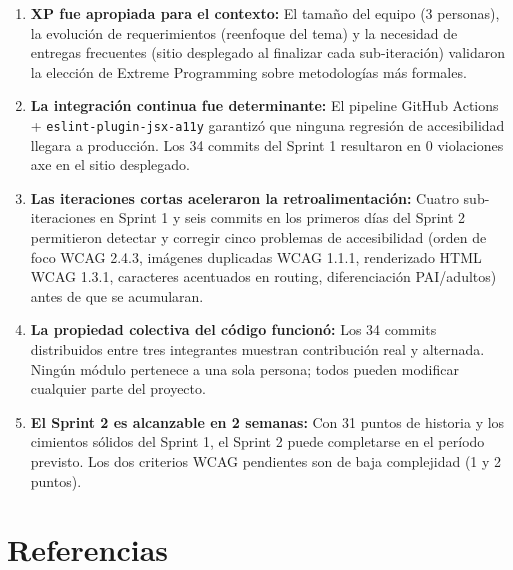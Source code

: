 \documentclass[12pt, a4paper]{article}
\begin{document}
\begin{enumerate}
  \item \textbf{XP fue apropiada para el contexto:} El tamaño del equipo (3 personas), la evolución de requerimientos (reenfoque del tema) y la necesidad de entregas frecuentes (sitio desplegado al finalizar cada sub-iteración) validaron la elección de Extreme Programming sobre metodologías más formales.

  \item \textbf{La integración continua fue determinante:} El pipeline GitHub Actions + \texttt{eslint-plugin-jsx-a11y} garantizó que ninguna regresión de accesibilidad llegara a producción. Los 34 commits del Sprint 1 resultaron en 0 violaciones axe en el sitio desplegado.

  \item \textbf{Las iteraciones cortas aceleraron la retroalimentación:} Cuatro sub-iteraciones en Sprint 1 y seis commits en los primeros días del Sprint 2 permitieron detectar y corregir cinco problemas de accesibilidad (orden de foco WCAG 2.4.3, imágenes duplicadas WCAG 1.1.1, renderizado HTML WCAG 1.3.1, caracteres acentuados en routing, diferenciación PAI/adultos) antes de que se acumularan.

  \item \textbf{La propiedad colectiva del código funcionó:} Los 34 commits distribuidos entre tres integrantes muestran contribución real y alternada. Ningún módulo pertenece a una sola persona; todos pueden modificar cualquier parte del proyecto.

  \item \textbf{El Sprint 2 es alcanzable en 2 semanas:} Con 31 puntos de historia y los cimientos sólidos del Sprint 1, el Sprint 2 puede completarse en el período previsto. Los dos criterios WCAG pendientes son de baja complejidad (1 y 2 puntos).
\end{enumerate}

\section*{Referencias}
\end{document}
